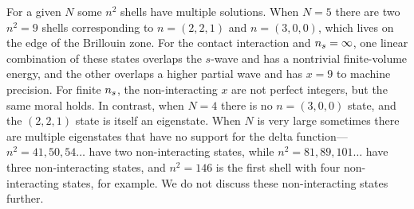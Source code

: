 For a given $N$ some $n^2$ shells have multiple solutions.
When $N=5$ there are two $n^2=9$ shells corresponding to $n=(2,2,1)$ and $n=(3,0,0)$, which lives on the edge of the Brillouin zone.
For the contact interaction and ${n_s}=\infty$, one linear combination of these \Aoneg states overlaps the $s$-wave and has a nontrivial finite-volume energy, and the other overlaps a higher partial wave and has $x=9$ to machine precision.
For finite ${n_s}$, the non-interacting $x$ are not perfect integers, but the same moral holds.
In contrast, when $N=4$ there is no $n=(3,0,0)$ state, and the $(2,2,1)$ state is itself an eigenstate.
When $N$ is very large sometimes there are multiple eigenstates that have no support for the delta function---$n^2=41, 50, 54\ldots$ have two non-interacting states, while $n^2=81, 89, 101\ldots$ have three non-interacting states, and $n^2=146$ is the first shell with four non-interacting states, for example.
We do not discuss these non-interacting states further.
